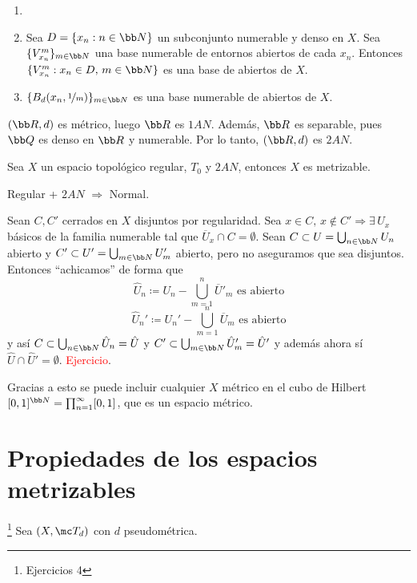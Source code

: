 \begin{dem}
    \begin{enumerate}
        \item \,
        \item Sea $D = \{x_n :n \in \bb N\}$ un subconjunto numerable y denso en $X$. Sea $\{V_{x_n}^m\}_{m \in \bb N}$ una base numerable de entornos abiertos de cada $x_n$. Entonces $\{V_{x_n}^m: x_n \in D, \, m \in \bb N\}$ es una base de abiertos de $X$.
        \item $\{ B_d(x_n, \nicefrac{1}{m}) \}_{m \in \bb N}$ es una base numerable de abiertos de $X$.
    \end{enumerate}
\end{dem}
\begin{ejem} $(\bb R,d)$ es m\'etrico, luego $\bb R$ es $1AN$. Adem\'as, $\bb R$ es separable, pues $\bb Q$ es denso en $\bb R$ y numerable. Por lo tanto, $(\bb R, d)$ es $2AN$.
\end{ejem}
\begin{teo}
     Sea $X$ un espacio topol\'ogico regular, $T_0$ y $2AN$, entonces $X$ es metrizable.
\end{teo}
\begin{lem}
Regular + $2AN$ $\Rightarrow$ Normal.
\end{lem}
\begin{dem}
    Sean $C,C'$ cerrados en $X$ disjuntos por regularidad. Sea $x\in C, \, x\nin C' \Rightarrow \exists \, U_x$ b\'asicos de la familia numerable tal que $\overline{U}_x \cap C = \emptyset$. Sean $C \subset U = \bigcup_{n \in \bb N} U_n$ abierto y $C' \subset U' = \bigcup_{m \in \bb N} U_m'$ abierto, pero no aseguramos que sea disjuntos. Entonces ``achicamos'' de forma que 
    $$\hat U_n \coloneqq U_n - \bigcup_{m=1}^{n} \overline{U}'_m \text{ es abierto}$$
    $$\hat U_n' \coloneqq U_n' - \bigcup_{m=1}^{n} \overline{U}_m \text{ es abierto}$$
    y as\'i $C\subset \bigcup_{n \in \bb N} \hat U_n = \hat U$ y $C' \subset \bigcup_{m \in \bb N} \hat U_m' = \hat U'$ y adem\'as ahora s\'i $\hat U\cap \hat U' =\emptyset$. \textcolor{red}{Ejercicio}. 
\end{dem}
\begin{obs}
    Gracias a esto se puede incluir cualquier $X$ m\'etrico en el cubo de Hilbert $[0,1]^{\bb N} = \prod_{n=1}^{\infty} [0,1]$, que es un espacio m\'etrico.
\end{obs}

\section{Propiedades de los espacios metrizables} \footnote{Ejercicios 4}
Sea $(X,\mc T_d)$ con $d$ pseudom\'etrica.

